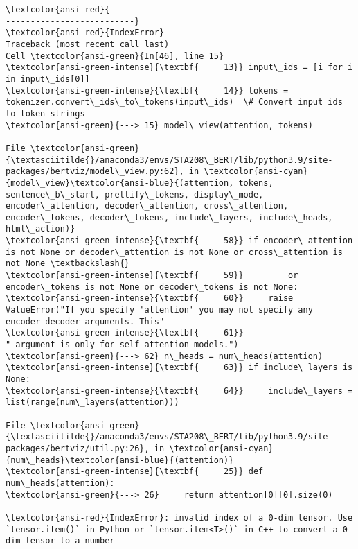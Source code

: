\documentclass[11pt]{article}
\begin{document}
    \begin{Verbatim}[commandchars=\\\{\}, frame=single, framerule=2mm, rulecolor=\color{outerrorbackground}]
\textcolor{ansi-red}{---------------------------------------------------------------------------}
\textcolor{ansi-red}{IndexError}                                Traceback (most recent call last)
Cell \textcolor{ansi-green}{In[46], line 15}
\textcolor{ansi-green-intense}{\textbf{     13}} input\_ids = [i for i in input\_ids[0]] 
\textcolor{ansi-green-intense}{\textbf{     14}} tokens = tokenizer.convert\_ids\_to\_tokens(input\_ids)  \# Convert input ids to token strings
\textcolor{ansi-green}{---> 15} model\_view(attention, tokens)

File \textcolor{ansi-green}{\textasciitilde{}/anaconda3/envs/STA208\_BERT/lib/python3.9/site-packages/bertviz/model\_view.py:62}, in \textcolor{ansi-cyan}{model\_view}\textcolor{ansi-blue}{(attention, tokens, sentence\_b\_start, prettify\_tokens, display\_mode, encoder\_attention, decoder\_attention, cross\_attention, encoder\_tokens, decoder\_tokens, include\_layers, include\_heads, html\_action)}
\textcolor{ansi-green-intense}{\textbf{     58}} if encoder\_attention is not None or decoder\_attention is not None or cross\_attention is not None \textbackslash{}
\textcolor{ansi-green-intense}{\textbf{     59}}         or encoder\_tokens is not None or decoder\_tokens is not None:
\textcolor{ansi-green-intense}{\textbf{     60}}     raise ValueError("If you specify 'attention' you may not specify any encoder-decoder arguments. This"
\textcolor{ansi-green-intense}{\textbf{     61}}                      " argument is only for self-attention models.")
\textcolor{ansi-green}{---> 62} n\_heads = num\_heads(attention)
\textcolor{ansi-green-intense}{\textbf{     63}} if include\_layers is None:
\textcolor{ansi-green-intense}{\textbf{     64}}     include\_layers = list(range(num\_layers(attention)))

File \textcolor{ansi-green}{\textasciitilde{}/anaconda3/envs/STA208\_BERT/lib/python3.9/site-packages/bertviz/util.py:26}, in \textcolor{ansi-cyan}{num\_heads}\textcolor{ansi-blue}{(attention)}
\textcolor{ansi-green-intense}{\textbf{     25}} def num\_heads(attention):
\textcolor{ansi-green}{---> 26}     return attention[0][0].size(0)

\textcolor{ansi-red}{IndexError}: invalid index of a 0-dim tensor. Use `tensor.item()` in Python or `tensor.item<T>()` in C++ to convert a 0-dim tensor to a number
    \end{Verbatim}
\end{document}
